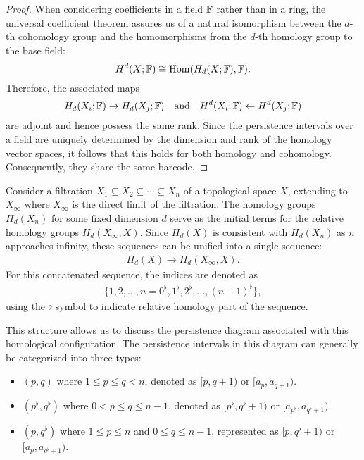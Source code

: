 \begin{proof}
When considering coefficients in a field ${\mathbb{F}}$ rather than in a ring, the universal coefficient theorem assures us of a natural isomorphism between the $d$-th cohomology group and the homomorphisms from the $d$-th homology group to the base field:
\begin{equation}
H^{d}(X; {\mathbb{F}}) \cong \operatorname{Hom}(H_{d}(X; {\mathbb{F}}), {\mathbb{F}}).
\end{equation}
Therefore, the associated maps
\begin{equation}
H_{d}(X_{i}; {\mathbb{F}}) \rightarrow H_{d}(X_{j}; {\mathbb{F}}) \quad \text{and} \quad H^{d}(X_{i}; {\mathbb{F}}) \leftarrow H^{d}(X_{j}; {\mathbb{F}})
\end{equation}
are adjoint and hence possess the same rank. Since the persistence intervals over a field are uniquely determined by the dimension and rank of the homology vector spaces, it follows that this holds for both homology and cohomology. Consequently, they share the same barcode.
\end{proof}

Consider a filtration $X_{1} \subseteq X_{2} \subseteq \cdots \subseteq X_{n}$ of a topological space $X$, extending to $X_{\infty}$ where $X_{\infty}$ is the direct limit of the filtration. The homology groups $H_{d}(X_{n})$ for some fixed dimension $d$ serve as the initial terms for the relative homology groups $H_{d}(X_{\infty}, X)$. Since $H_{d}(X)$ is consistent with $H_{d}(X_{n})$ as $n$ approaches infinity, these sequences can be unified into a single sequence:
\begin{align}
H_{d}(X) \to H_{d}(X_{\infty}, X).
\end{align}
For this concatenated sequence, the indices are denoted as
\begin{align}
\{1, 2, \ldots, n = 0^{\flat}, 1^{\flat}, 2^{\flat}, \ldots, (n-1)^{\flat}\},
\end{align}
using the $\flat$ symbol to indicate relative homology part of the sequence.

This structure allows us to discuss the persistence diagram associated with this homological configuration. The persistence intervals in this diagram can generally be categorized into three types:


\begin{itemize}
	\item $(p, q)$ where $1 \leq p \leq q < n$, denoted as
		$[p, q+1)$ or $[a_{p}, a_{q+1})$.

	\item $(p^{\flat}, q^{\flat})$ where $0 < p \leq q \leq n
		-1$, denoted as $[p^{\flat}, q^{\flat}+1)$ or $[a_{p^\flat}, a_{q^\flat+1})$.

	\item $(p, q^{\flat})$ where $1 \leq p \leq n$ and $0 \leq
		q \leq n-1$, represented as $[p, q^{\flat}+1)$ or $[a_{p}, a_{q^\flat+1})$.
\end{itemize}

